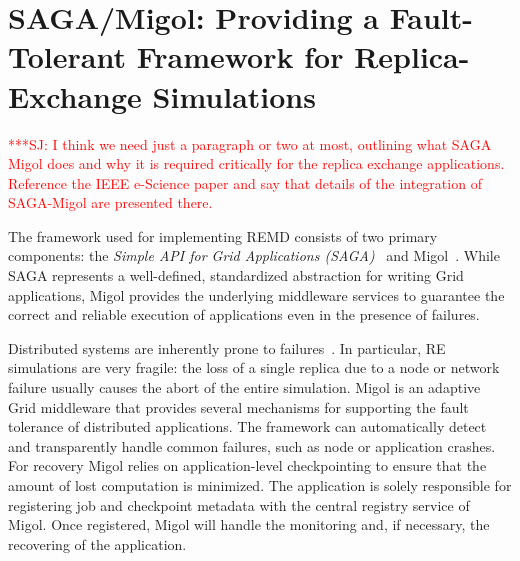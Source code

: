 \documentclass{rspublic}
\newcommand{\jhanote}[1]{ {\textcolor{red} { ***SJ: #1 }}}
\newcommand{\jhanote}[1]{}
\begin{document}
\section{SAGA/Migol: Providing a Fault-Tolerant Framework 
for Replica-Exchange Simulations}\label{sec:sagamigol}

\jhanote{I think we need just a paragraph or two at most, outlining
  what SAGA Migol does and why it is required critically for the
  replica exchange applications. Reference the IEEE e-Science paper
  and say that details of the integration of SAGA-Migol are presented
  there.}


The framework used for implementing REMD consists of two primary
components: the \textit{Simple API for Grid Applications
(SAGA)}~\citep{saga_gfd90} and Migol~\citep{schnorLuckow08}.  While
SAGA represents a well-defined, standardized abstraction for writing
Grid applications, Migol provides the underlying middleware services
to guarantee the correct and reliable exe\-cution of applications even
in the presence of failures.

Distributed systems are inherently prone to 
failures~\citep{schroeder,10.1109/E-SCIENCE.2006.93}.    
In particular, RE simulations are very fragile: the loss of a single
replica due to a node or network failure usually causes the
abort of the entire simulation. Migol is an adaptive Grid middleware 
that provides several mechanisms for supporting the fault tolerance of 
distributed applications. 
The framework can automatically detect and transparently handle common
failures, such as node or application crashes. For recovery Migol
relies on application-level checkpointing to ensure that the amount of
lost computation is minimized. The application is solely responsible
for registering job and checkpoint metadata with the central registry
service of Migol. Once registered, Migol will handle the monitoring
and, if necessary, the recovering of the application.
\end{document}
